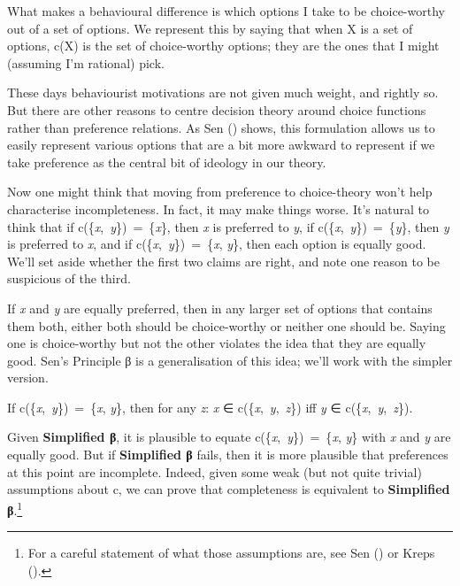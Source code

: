 \documentclass[
  10pt,
  letterpaper,
  DIV=11,
  numbers=noendperiod,
  twoside]{scrartcl}
\providecommand{\tightlist}{%
  \setlength{\itemsep}{0pt}\setlength{\parskip}{0pt}}\usepackage{longtable,booktabs,array}
\begin{document}
What makes a behavioural difference is which options I take to be
choice-worthy out of a set of options. We represent this by saying that
when X is a set of options, c(X) is the set of choice-worthy options;
they are the ones that I might (assuming I'm rational) pick.

These days behaviourist motivations are not given much weight, and
rightly so. But there are other reasons to centre decision theory around
choice functions rather than preference relations. As Sen
() shows, this formulation allows us to
easily represent various options that are a bit more awkward to
represent if we take preference as the central bit of ideology in our
theory.

Now one might think that moving from preference to choice-theory won't
help characterise incompleteness. In fact, it may make things worse.
It's natural to think that if c(\{\emph{x},~\emph{y}\})~=~\{\emph{x}\},
then \emph{x} is preferred to \emph{y}, if
c(\{\emph{x},~\emph{y}\})~=~\{\emph{y}\}, then \emph{y} is preferred to
\emph{x}, and if c(\{\emph{x},~\emph{y}\})~=~\{\emph{x}, \emph{y}\},
then each option is equally good. We'll set aside whether the first two
claims are right, and note one reason to be suspicious of the third.

If \emph{x} and \emph{y} are equally preferred, then in any larger set
of options that contains them both, either both should be choice-worthy
or neither one should be. Saying one is choice-worthy but not the other
violates the idea that they are equally good. Sen's Principle β is a
generalisation of this idea; we'll work with the simpler version.

\begin{description}
\tightlist
\item[Simplified β]
If c(\{\emph{x},~\emph{y}\})~=~\{\emph{x}, \emph{y}\}, then for any
\emph{z}: \emph{x} ∈ c(\{\emph{x},~\emph{y},~\emph{z}\}) iff \emph{y} ∈
c(\{\emph{x},~\emph{y},~\emph{z}\}).
\end{description}

Given \textbf{Simplified β}, it is plausible to equate
c(\{\emph{x},~\emph{y}\})~=~\{\emph{x}, \emph{y}\} with \emph{x} and
\emph{y} are equally good. But if \textbf{Simplified β} fails, then it
is more plausible that preferences at this point are incomplete. Indeed,
given some weak (but not quite trivial) assumptions about c, we can
prove that completeness is equivalent to \textbf{Simplified
β}.\footnote{For a careful statement of what those assumptions are, see
  Sen () or Kreps
  ().}
\end{document}
